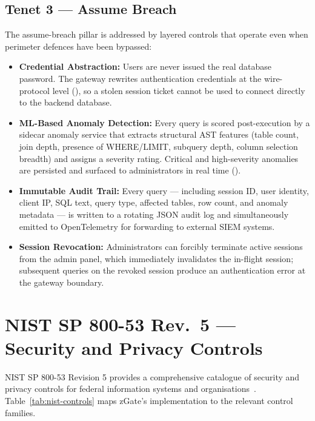 \subsection{Tenet 3 --- Assume Breach}

The assume-breach pillar is addressed by layered controls that operate even when perimeter defences have been bypassed:

\begin{itemize}
    \item \textbf{Credential Abstraction:} Users are never issued the real database password. The gateway rewrites authentication credentials at the wire-protocol level (), so a stolen session ticket cannot be used to connect directly to the backend database.
    \item \textbf{ML-Based Anomaly Detection:} Every query is scored post-execution by a sidecar anomaly service that extracts structural AST features (table count, join depth, presence of WHERE/LIMIT, subquery depth, column selection breadth) and assigns a severity rating. Critical and high-severity anomalies are persisted and surfaced to administrators in real time ().
    \item \textbf{Immutable Audit Trail:} Every query --- including session ID, user identity, client IP, SQL text, query type, affected tables, row count, and anomaly metadata --- is written to a rotating JSON audit log and simultaneously emitted to OpenTelemetry for forwarding to external SIEM systems.
    \item \textbf{Session Revocation:} Administrators can forcibly terminate active sessions from the admin panel, which immediately invalidates the in-flight session; subsequent queries on the revoked session produce an authentication error at the gateway boundary.
\end{itemize}

\section{NIST SP 800-53 Rev.\ 5 --- Security and Privacy Controls}

NIST SP 800-53 Revision 5 provides a comprehensive catalogue of security and privacy controls for federal information systems and organisations~\cite{nist-controls}. Table~\ref{tab:nist-controls} maps zGate's implementation to the relevant control families.


